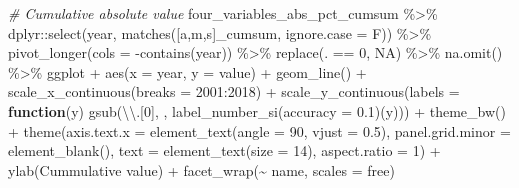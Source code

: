 \documentclass[10pt,landscape,a3paper]{article}
\newenvironment{Shaded}{\begin{snugshade}}{\end{snugshade}}
\newcommand{\AttributeTok}[1]{\textcolor[rgb]{0.77,0.63,0.00}{#1}}
\newcommand{\CommentTok}[1]{\textcolor[rgb]{0.56,0.35,0.01}{\textit{#1}}}
\newcommand{\ConstantTok}[1]{\textcolor[rgb]{0.00,0.00,0.00}{#1}}
\newcommand{\ControlFlowTok}[1]{\textcolor[rgb]{0.13,0.29,0.53}{\textbf{#1}}}
\newcommand{\DecValTok}[1]{\textcolor[rgb]{0.00,0.00,0.81}{#1}}
\newcommand{\FloatTok}[1]{\textcolor[rgb]{0.00,0.00,0.81}{#1}}
\newcommand{\FunctionTok}[1]{\textcolor[rgb]{0.00,0.00,0.00}{#1}}
\newcommand{\NormalTok}[1]{#1}
\newcommand{\SpecialCharTok}[1]{\textcolor[rgb]{0.00,0.00,0.00}{#1}}
\newcommand{\StringTok}[1]{\textcolor[rgb]{0.31,0.60,0.02}{#1}}
\begin{document}
\begin{Shaded}
\begin{Highlighting}[]
\CommentTok{\# Cumulative absolute value}
\NormalTok{four\_variables\_abs\_pct\_cumsum }\SpecialCharTok{\%\textgreater{}\%}
\NormalTok{  dplyr}\SpecialCharTok{::}\FunctionTok{select}\NormalTok{(year, }\FunctionTok{matches}\NormalTok{(}\StringTok{\textquotesingle{}[a,m,s]\_cumsum\textquotesingle{}}\NormalTok{, }\AttributeTok{ignore.case =}\NormalTok{ F)) }\SpecialCharTok{\%\textgreater{}\%} 
  \FunctionTok{pivot\_longer}\NormalTok{(}\AttributeTok{cols =} \SpecialCharTok{{-}}\FunctionTok{contains}\NormalTok{(}\StringTok{\textquotesingle{}year\textquotesingle{}}\NormalTok{)) }\SpecialCharTok{\%\textgreater{}\%} 
  \FunctionTok{replace}\NormalTok{(. }\SpecialCharTok{==} \DecValTok{0}\NormalTok{, }\ConstantTok{NA}\NormalTok{) }\SpecialCharTok{\%\textgreater{}\%} 
  \FunctionTok{na.omit}\NormalTok{() }\SpecialCharTok{\%\textgreater{}\%} 
\NormalTok{  ggplot }\SpecialCharTok{+} \FunctionTok{aes}\NormalTok{(}\AttributeTok{x =}\NormalTok{ year, }\AttributeTok{y =}\NormalTok{ value) }\SpecialCharTok{+} \FunctionTok{geom\_line}\NormalTok{() }\SpecialCharTok{+}
  \FunctionTok{scale\_x\_continuous}\NormalTok{(}\AttributeTok{breaks =} \DecValTok{2001}\SpecialCharTok{:}\DecValTok{2018}\NormalTok{) }\SpecialCharTok{+} 
  \FunctionTok{scale\_y\_continuous}\NormalTok{(}\AttributeTok{labels =} \ControlFlowTok{function}\NormalTok{(y) }\FunctionTok{gsub}\NormalTok{(}\StringTok{\textquotesingle{}}\SpecialCharTok{\textbackslash{}\textbackslash{}}\StringTok{.[0]\textquotesingle{}}\NormalTok{, }\StringTok{\textquotesingle{}\textquotesingle{}}\NormalTok{, }\FunctionTok{label\_number\_si}\NormalTok{(}\AttributeTok{accuracy =} \FloatTok{0.1}\NormalTok{)(y))) }\SpecialCharTok{+}
  \FunctionTok{theme\_bw}\NormalTok{() }\SpecialCharTok{+}
  \FunctionTok{theme}\NormalTok{(}\AttributeTok{axis.text.x =} \FunctionTok{element\_text}\NormalTok{(}\AttributeTok{angle =} \DecValTok{90}\NormalTok{, }\AttributeTok{vjust =} \FloatTok{0.5}\NormalTok{), }\AttributeTok{panel.grid.minor =} \FunctionTok{element\_blank}\NormalTok{(),}
        \AttributeTok{text =} \FunctionTok{element\_text}\NormalTok{(}\AttributeTok{size =} \DecValTok{14}\NormalTok{), }\AttributeTok{aspect.ratio =} \DecValTok{1}\NormalTok{) }\SpecialCharTok{+}
  \FunctionTok{ylab}\NormalTok{(}\StringTok{\textquotesingle{}Cummulative value\textquotesingle{}}\NormalTok{) }\SpecialCharTok{+}
  \FunctionTok{facet\_wrap}\NormalTok{(}\SpecialCharTok{\textasciitilde{}}\NormalTok{ name, }\AttributeTok{scales =} \StringTok{\textquotesingle{}free\textquotesingle{}}\NormalTok{)}
\end{Highlighting}
\end{Shaded}
\end{document}
